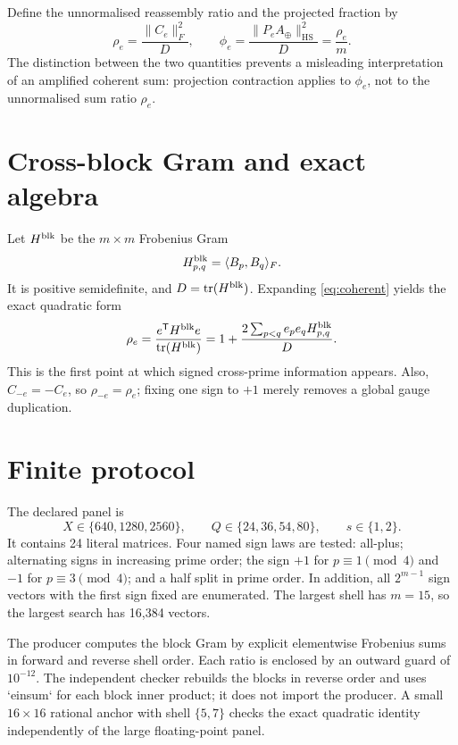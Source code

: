 \documentclass[10pt]{article}
\newcommand{\tr}{\operatorname{tr}}
\newcommand{\HS}{\operatorname{HS}}
\begin{document}
Define the unnormalised reassembly ratio and the projected fraction by
\begin{equation}
 \rho_e=\frac{\|C_e\|_F^2}{D},
 \qquad \phi_e=\frac{\|P_eA_\oplus\|_{\HS}^2}{D}=\frac{\rho_e}{m}.
 \label{eq:ratios}
\end{equation}
The distinction between the two quantities prevents a misleading
interpretation of an amplified coherent sum: projection contraction applies
to $\phi_e$, not to the unnormalised sum ratio $\rho_e$.

\section{Cross-block Gram and exact algebra}

Let $H^{\rm blk}$ be the $m\times m$ Frobenius Gram
\begin{equation}
 H^{\rm blk}_{p,q}=\langle B_p,B_q\rangle_F.
 \label{eq:blockgram}
\end{equation}
It is positive semidefinite, and $D=\tr(H^{\rm blk})$.  Expanding
\eqref{eq:coherent} yields the exact quadratic form
\begin{equation}
 \rho_e=\frac{e^{\mathsf T}H^{\rm blk}e}{\tr(H^{\rm blk})}
 =1+\frac{2\sum_{p<q}e_pe_qH^{\rm blk}_{p,q}}{D}.
 \label{eq:quadratic}
\end{equation}
This is the first point at which signed cross-prime information appears.
Also, $C_{-e}=-C_e$, so $\rho_{-e}=\rho_e$; fixing one sign to $+1$ merely
removes a global gauge duplication.

\section{Finite protocol}

The declared panel is
\[
 X\in\{640,1280,2560\},\qquad Q\in\{24,36,54,80\},\qquad s\in\{1,2\}.
\]
It contains 24 literal matrices.  Four named sign laws are tested:
all-plus; alternating signs in increasing prime order; the sign
$+1$ for $p\equiv1\pmod4$ and $-1$ for $p\equiv3\pmod4$; and a half split
in prime order.  In addition, all $2^{m-1}$ sign vectors with the first sign
fixed are enumerated.  The largest shell has $m=15$, so the largest search
has 16,384 vectors.

The producer computes the block Gram by explicit elementwise Frobenius sums
in forward and reverse shell order.  Each ratio is enclosed by an outward
guard of $10^{-12}$.  The independent checker rebuilds the blocks in reverse
order and uses `einsum` for each block inner product; it does not import the
producer.  A small $16\times16$ rational anchor with shell $\{5,7\}$ checks
the exact quadratic identity independently of the large floating-point
panel.
\end{document}

